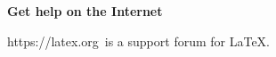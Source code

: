 \documentclass{article}
\begin{document}
\sffamily\bfseries Get help on the Internet\normalfont

\ttfamily https://latex.org\normalfont\ is
a support forum for \LaTeX.
\end{document}
